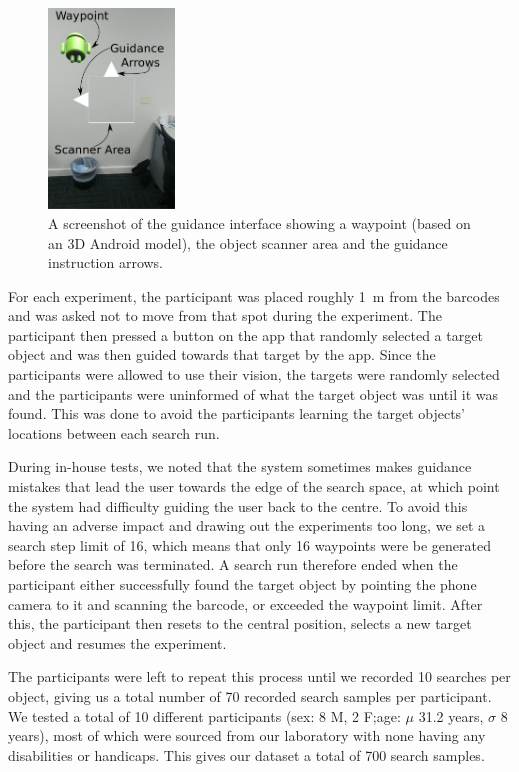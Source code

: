 \documentclass[a4paper, twoside]{article}
\begin{document}
\begin{figure}
  \centering
  \includegraphics[width=0.3\textwidth]{figures/system_screenshot.png}
  \caption{A screenshot of the guidance interface showing a waypoint (based on an 3D Android model), the object scanner area and the guidance instruction arrows. }\label{fig:system-screenshot}
\end{figure}

For each experiment, the participant was placed roughly \SI{1}{\meter} from the barcodes and was asked not to move from that spot during the experiment. The participant then pressed a button on the app that randomly selected a target object and was then guided towards that target by the app. Since the participants were allowed to use their vision, the targets were randomly selected and the participants were uninformed of what the target object was until it was found. This was done to avoid the participants learning the target objects' locations between each search run.

During in-house tests, we noted that the system sometimes makes guidance mistakes that lead the user towards the edge of the search space, at which point the system had difficulty guiding the user back to the centre. To avoid this having an adverse impact and drawing out the experiments too long, we set a search step limit of 16, which means that only 16 waypoints were be generated before the search was terminated. A search run therefore ended when the participant either successfully found the target object by pointing the phone camera to it and scanning the barcode, or exceeded the waypoint limit. After this, the participant then resets to the central position, selects a new target object and resumes the experiment.

The participants were left to repeat this process until we recorded 10 searches per object, giving us a total number of 70 recorded search samples per participant. We tested a total of 10 different participants (sex: 8 M, 2 F;\@ age: $\mu$ 31.2 years, $\sigma$ 8 years), most of which were sourced from our laboratory with none having any disabilities or handicaps. This gives our dataset a total of 700 search samples.
\end{document}
